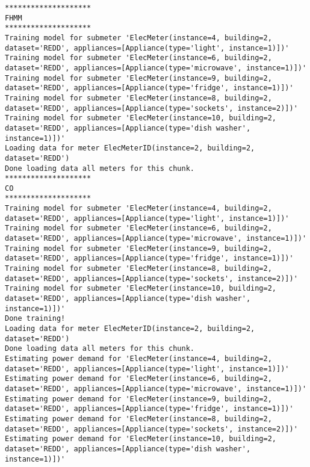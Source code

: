 \documentclass[11pt]{article}
\begin{document}
    \begin{Verbatim}[commandchars=\\\{\}]
********************
FHMM
********************
Training model for submeter 'ElecMeter(instance=4, building=2, dataset='REDD', appliances=[Appliance(type='light', instance=1)])'
Training model for submeter 'ElecMeter(instance=6, building=2, dataset='REDD', appliances=[Appliance(type='microwave', instance=1)])'
Training model for submeter 'ElecMeter(instance=9, building=2, dataset='REDD', appliances=[Appliance(type='fridge', instance=1)])'
Training model for submeter 'ElecMeter(instance=8, building=2, dataset='REDD', appliances=[Appliance(type='sockets', instance=2)])'
Training model for submeter 'ElecMeter(instance=10, building=2, dataset='REDD', appliances=[Appliance(type='dish washer', instance=1)])'
Loading data for meter ElecMeterID(instance=2, building=2, dataset='REDD')     
Done loading data all meters for this chunk.
********************
CO
********************
Training model for submeter 'ElecMeter(instance=4, building=2, dataset='REDD', appliances=[Appliance(type='light', instance=1)])'
Training model for submeter 'ElecMeter(instance=6, building=2, dataset='REDD', appliances=[Appliance(type='microwave', instance=1)])'
Training model for submeter 'ElecMeter(instance=9, building=2, dataset='REDD', appliances=[Appliance(type='fridge', instance=1)])'
Training model for submeter 'ElecMeter(instance=8, building=2, dataset='REDD', appliances=[Appliance(type='sockets', instance=2)])'
Training model for submeter 'ElecMeter(instance=10, building=2, dataset='REDD', appliances=[Appliance(type='dish washer', instance=1)])'
Done training!
Loading data for meter ElecMeterID(instance=2, building=2, dataset='REDD')     
Done loading data all meters for this chunk.
Estimating power demand for 'ElecMeter(instance=4, building=2, dataset='REDD', appliances=[Appliance(type='light', instance=1)])'
Estimating power demand for 'ElecMeter(instance=6, building=2, dataset='REDD', appliances=[Appliance(type='microwave', instance=1)])'
Estimating power demand for 'ElecMeter(instance=9, building=2, dataset='REDD', appliances=[Appliance(type='fridge', instance=1)])'
Estimating power demand for 'ElecMeter(instance=8, building=2, dataset='REDD', appliances=[Appliance(type='sockets', instance=2)])'
Estimating power demand for 'ElecMeter(instance=10, building=2, dataset='REDD', appliances=[Appliance(type='dish washer', instance=1)])'

    \end{Verbatim}
\end{document}

